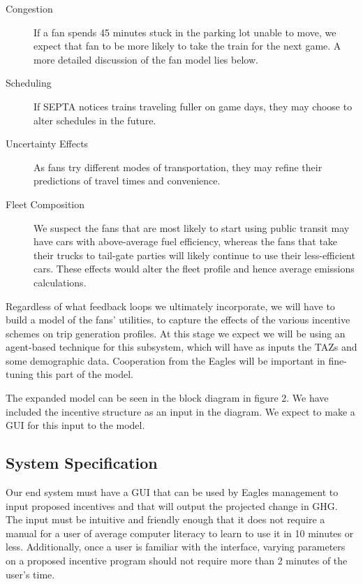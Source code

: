 \documentclass[draft,12pt,titlepage]{article}
\begin{document}
\begin{description}
  \item[Congestion] \hfill If a fan spends 45 minutes stuck in the parking lot unable to
move, we expect that fan to be more likely to take the train for the next game. A more
detailed discussion of the fan model lies below.
  \item[Scheduling] \hfill If SEPTA notices trains traveling fuller on game days, they may
choose to alter schedules in the future.
  \item[Uncertainty Effects] \hfill As fans try different modes of transportation, they may refine
their predictions of travel times and convenience.
  \item[Fleet Composition] \hfill We suspect the fans that are most likely to start using
public transit may have cars with above-average fuel efficiency, whereas the fans that
take their trucks to tail-gate parties will likely continue to use their less-efficient cars.
These effects would alter the fleet profile and hence average emissions calculations.
\end{description}

Regardless of what feedback loops we ultimately incorporate, we will have to build a model
of the fans' utilities, to capture the effects of the various incentive schemes on trip generation
profiles. At this stage we expect we will be using an agent-based technique for this
subsystem, which will have as inputs the TAZs and some demographic data. Cooperation
from the Eagles will be important in fine-tuning this part of the model.

The expanded model can be seen in the block diagram in figure 2. We have included the
incentive structure as an input in the diagram. We expect to make a GUI for this input to the
model.

\subsection{System Specification}
Our end system must have a GUI that can be used by Eagles management to input proposed
incentives and that will output the projected change in GHG. The input must be intuitive and
friendly enough that it does not require a manual for a user of average computer literacy to
learn to use it in 10 minutes or less. Additionally, once a user is familiar with the interface,
varying parameters on a proposed incentive program should not require more than 2 minutes
of the user's time.
\end{document}
